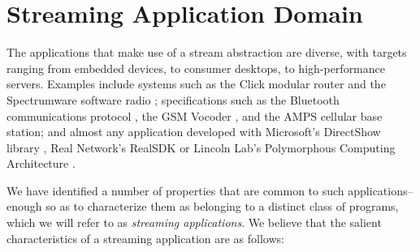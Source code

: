 \section{Streaming Application Domain}
\label{sec:domain}

The applications that make use of a stream abstraction are diverse,
with targets ranging from embedded devices, to consumer desktops, to
high-performance servers.  Examples include systems such as the Click
modular router \cite{click} and the Spectrumware software radio
\cite{spectrumware,softwareradio}; specifications such as the
Bluetooth communications protocol \cite{bluetooth}, the GSM Vocoder
\cite{gsm}, and the AMPS cellular base station\cite{amps}; and almost
any application developed with Microsoft's DirectShow library
\cite{directshow}, Real Network's RealSDK \cite{realsdk} or Lincoln
Lab's Polymorphous Computing Architecture \cite{pca}.

We have identified a number of properties that are common to such
applications--enough so as to characterize them as belonging to a
distinct class of programs, which we will refer to as \emph{streaming
  applications}.  We believe that the salient characteristics of a
streaming application are as follows:

